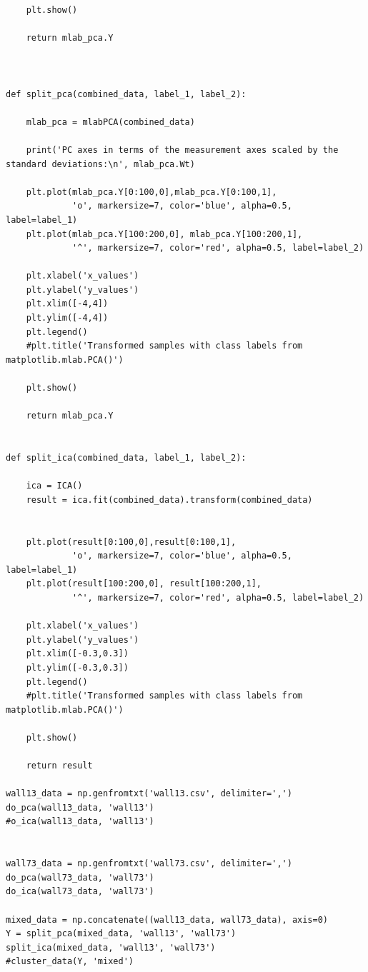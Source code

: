 \documentclass[paper=a4, fontsize=11pt]{scrartcl} %
\numberwithin{equation}{section} %
\numberwithin{figure}{section} %
\numberwithin{table}{section} %
\begin{document}
\begin{lstlisting}
    plt.show()
    
    return mlab_pca.Y



def split_pca(combined_data, label_1, label_2):
    
    mlab_pca = mlabPCA(combined_data)
    
    print('PC axes in terms of the measurement axes scaled by the standard deviations:\n', mlab_pca.Wt)
    
    plt.plot(mlab_pca.Y[0:100,0],mlab_pca.Y[0:100,1],
             'o', markersize=7, color='blue', alpha=0.5, label=label_1)
    plt.plot(mlab_pca.Y[100:200,0], mlab_pca.Y[100:200,1],
             '^', markersize=7, color='red', alpha=0.5, label=label_2)
    
    plt.xlabel('x_values')
    plt.ylabel('y_values')
    plt.xlim([-4,4])
    plt.ylim([-4,4])
    plt.legend()
    #plt.title('Transformed samples with class labels from matplotlib.mlab.PCA()')
    
    plt.show()
    
    return mlab_pca.Y
   

def split_ica(combined_data, label_1, label_2):
    
    ica = ICA()
    result = ica.fit(combined_data).transform(combined_data)
    
    
    plt.plot(result[0:100,0],result[0:100,1],
             'o', markersize=7, color='blue', alpha=0.5, label=label_1)
    plt.plot(result[100:200,0], result[100:200,1],
             '^', markersize=7, color='red', alpha=0.5, label=label_2)
    
    plt.xlabel('x_values')
    plt.ylabel('y_values')
    plt.xlim([-0.3,0.3])
    plt.ylim([-0.3,0.3])
    plt.legend()
    #plt.title('Transformed samples with class labels from matplotlib.mlab.PCA()')
    
    plt.show()
    
    return result

wall13_data = np.genfromtxt('wall13.csv', delimiter=',')
do_pca(wall13_data, 'wall13')
#o_ica(wall13_data, 'wall13')   


wall73_data = np.genfromtxt('wall73.csv', delimiter=',')
do_pca(wall73_data, 'wall73')
do_ica(wall73_data, 'wall73')    

mixed_data = np.concatenate((wall13_data, wall73_data), axis=0)
Y = split_pca(mixed_data, 'wall13', 'wall73')
split_ica(mixed_data, 'wall13', 'wall73')
#cluster_data(Y, 'mixed')
\end{lstlisting}
\end{document}
